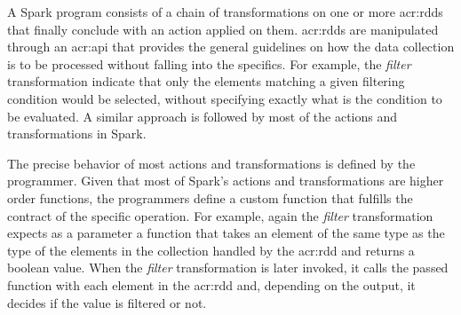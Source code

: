 \label{sec:conceptual-process}






A Spark program consists of a chain of transformations on one or more \acrshort{acr:rdd}s that finally conclude with an action applied on them. \acrshort{acr:rdd}s are manipulated through an \acrshort{acr:api} that provides the general guidelines on how the data collection is to be processed without falling into the specifics. For example, the \textit{filter} transformation indicate that only the elements matching a given filtering condition would be selected, without specifying exactly what is the condition to be evaluated. A similar approach is followed by most of the actions and transformations in Spark.

The precise behavior of most actions and transformations is defined by the programmer. Given that most of Spark's actions and transformations are higher order functions, the programmers define a custom function that fulfills the contract of the specific operation. For example, again the \textit{filter} transformation expects as a parameter a function that takes an element of the same type as the type of the elements in the collection handled by the \acrshort{acr:rdd} and returns a boolean value. When the \textit{filter} transformation is later invoked, it calls the passed function with each element in the \acrshort{acr:rdd} and, depending on the output, it decides if the value is filtered or not.


